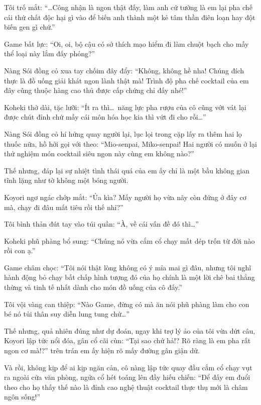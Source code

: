 \documentclass[../main.tex]{subfiles}
\begin{document}
Tôi trố mắt: ``\dots Công nhận là ngon thật đấy, làm anh cứ tưởng là em lại pha chế cái thứ chất độc hại gì vào để biến anh thành một kẻ tâm thần điên loạn hay đột biến gen gì chứ.''

Game bất lực: ``Oi, oi, bộ cậu có sở thích mạo hiểm đi làm chuột bạch cho mấy thể loại này lắm đấy phỏng?''

Nàng Sói đồng cỏ xua tay chốim đây đẩy: ``Không, không hề nha! Chúng đích thực là đồ uống giải khát ngon lành thật mà! Trình độ pha chế cocktail của em đây cũng thuộc hàng cao thủ được cấp chứng chỉ đấy nhé!''

Koheki thở dài, tặc lưỡi: ``Ít ra thì\dots\ năng lực pha rượu của cô cũng vớt vát lại được chút đỉnh chứ mấy cái môn hóa học kia thì vứt đi cho rồi\dots''

Nàng Sói đồng cỏ hí hửng quay người lại, lục lọi trong cặp lấy ra thêm hai lọ thuốc nữa, hồ hởi gọi với theo: ``Mio-senpai, Miko-senpai! Hai người có muốn ở lại thử nghiệm món cocktail siêu ngon này cùng em không nào?''

Thế nhưng, đáp lại sự nhiệt tình thái quá của em ấy chỉ là một bầu không gian tĩnh lặng như tờ không một bóng người.

Koyori ngơ ngác chớp mắt: ``Ủa kìa? Mấy người họ vừa nãy còn đứng ở đây cơ mà, chạy đi đâu mất tiêu rồi thế nhỉ?''

Tôi bình thản đút tay vào túi quần: ``À, về cái vấn đề đó thì\dots''

Koheki phũ phàng bổ sung: ``Chúng nó vừa cắm cổ chạy mất dép trốn từ đời nào rồi con ạ.''

Game châm chọc: ``Tôi nói thật lòng không có ý mỉa mai gì đâu, nhưng tôi nghĩ hành động bỏ chạy bất chấp hình tượng đó của họ chính là một lời chê bai thẳng thừng và tinh tế nhất dành cho món đồ uống của cô đấy.''

Tôi vội vàng can thiệp: ``Nào Game, đừng có mà ăn nói phũ phàng làm cho con bé nó tủi thân suy diễn lung tung chứ\dots''

Thế nhưng, quả nhiên đúng như dự đoán, ngay khi trợ lý ảo của tôi vừa dứt câu, Koyori lập tức nổi đóa, gân cổ cãi cùn: ``Tại sao chứ hả!? Rõ ràng là em pha rất ngon cơ mà!?'' trên trán em ấy hiện rõ mấy đường gân giận dữ.

Và rồi, không kịp để ai kịp ngăn cản, cô nàng lập tức quay đầu cắm cổ chạy vụt ra ngoài cửa văn phòng, ngửa cổ hét toáng lên đầy hiếu chiến: ``Để đấy em đuổi theo cho họ thấy thế nào là đỉnh cao nghệ thuật cocktail thực thụ mới là châm ngôn sống!''
\end{document}
